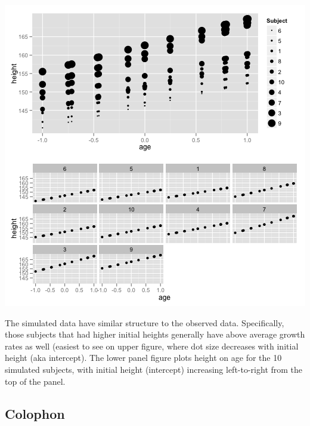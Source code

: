 \documentclass{article}
\makeatletter
\newenvironment{kframe}{%
 \def\FrameCommand##1{\hskip\@totalleftmargin \hskip-\fboxsep
 \colorbox{shadecolor}{##1}\hskip-\fboxsep
     \hskip-\linewidth \hskip-\@totalleftmargin \hskip\columnwidth}%
 \MakeFramed {\advance\hsize-\width
   \@totalleftmargin\z@ \linewidth\hsize
   \@setminipage}}%
 {\par\unskip\endMakeFramed}
\newenvironment{knitrout}{}{} %
\makeatother
\begin{document}
\begin{knitrout}
{\begin{kframe}
\includegraphics{ox-simulate} \end{kframe}}
\end{knitrout}


The simulated data have similar structure to the observed data. 
Specifically, those subjects that had higher initial heights generally have above average growth rates as well (easiest to see on upper figure, where dot size decreases with initial height (aka intercept). 
The lower panel figure plots height on age for the 10 simulated subjects, with initial height (intercept) increasing left-to-right from the top of the panel.


\newpage
\subsection*{Colophon}
\end{document}
